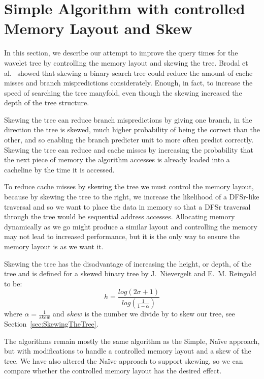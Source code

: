 \section{Simple Algorithm with controlled Memory Layout and Skew}
\label{sec:memorylayout}
In this section, we describe our attempt to improve the query times for the wavelet tree by controlling the memory layout and skewing the tree.
Brodal et al.~\cite{gerthSkewedBinarySearchTrees} showed that skewing a binary search tree could reduce the amount of cache misses and branch mispredictions considerately. Enough, in fact, to increase the speed of searching the tree manyfold, even though the skewing increased the depth of the tree structure.

Skewing the tree can reduce branch mispredictions by giving one branch, in the direction the tree is skewed, much higher probability of being the correct than the other, and so enabling the branch predicter unit to more often predict correctly. 
Skewing the tree can reduce and cache misses by increasing the probability that the next piece of memory the algorithm accesses is already loaded into a cacheline by the time it is accessed.

To reduce cache misses by skewing the tree we must control the memory layout, because by skewing the tree to the right, we increase the likelihood of a DFSr-like traversal and so we want to place the data in memory so that a DFSr traversal through the tree would be sequential address accesses.
Allocating memory dynamically as we go might produce a similar layout and controlling the memory may not lead to increased performance, but it is the only way to ensure the memory layout is as we want it.

Skewing the tree has the disadvantage of increasing the height, or depth, of the tree 
and is defined for a skewed binary tree by J.~Nievergelt and E.~M. Reingold~\cite{Nievergelt:1972:BST:800152.804906} to be:
\[ h = \frac{log(2\sigma+1)}{ log(\frac{1}{1-\alpha})}\]
where $\alpha = \frac{1}{skew}$ and $skew$ is the number we divide by to skew our tree, see Section~\ref{sec:SkewingTheTree}.

The algorithms remain mostly the same algorithm as the Simple, Naïve approach, but with modifications to handle a controlled memory layout and a skew of the tree.
We have also altered the Naïve approach to support skewing, so we can compare whether the controlled memory layout has the desired effect.

